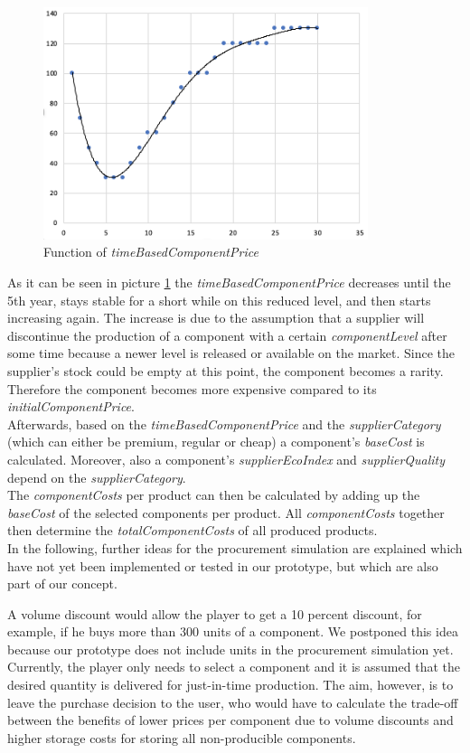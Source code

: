 \begin{figure} [H]
    \centering
	\includegraphics[width=9.5cm]{images/timeBasedComponentFunction.png}
	\caption{Function of \textit{timeBasedComponentPrice}}
	\label{img:timeBasedComponentPriceFunction}
\end{figure}
As it can be seen in picture \ref{img:timeBasedComponentPriceFunction} the \textit{timeBasedComponentPrice} decreases until the 5th year, stays stable for a short while on this reduced level, and then starts increasing again. The increase is due to the assumption that a supplier will discontinue the production of a component with a certain \textit{componentLevel} after some time because a newer level is released or available on the market. Since the supplier’s stock could be empty at this point, the component becomes a rarity. Therefore the component becomes more expensive compared to its \textit{initialComponentPrice}.\\
Afterwards, based on the \textit{timeBasedComponentPrice} and the \textit{supplierCategory} (which can either be premium, regular or cheap) a component's \textit{baseCost} is calculated. Moreover, also a component's \textit{supplierEcoIndex} and \textit{supplierQuality} depend on the \textit{supplierCategory}.\\
The \textit{componentCosts} per product can then be calculated by adding up the \textit{baseCost} of the selected components per product. All \textit{componentCosts} together then determine the \textit{totalComponentCosts} of all produced products.\\

In the following, further ideas for the procurement simulation are explained which have not yet been implemented or tested in our prototype, but which are also part of our concept.

A volume discount would allow the player to get a 10 percent discount, for example, if he buys more than 300 units of a component. We postponed this idea because our prototype does not include units in the procurement simulation yet. Currently, the player only needs to select a component and it is assumed that the desired quantity is delivered for just-in-time production. 
The aim, however, is to leave the purchase decision to the user, who would have to calculate the trade-off between the benefits of lower prices per component due to volume discounts and higher storage costs for storing all non-producible components.